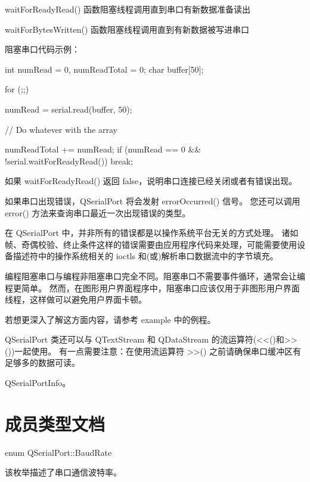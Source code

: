 \begin{compactitem}
\item waitForReadyRead() 函数阻塞线程调用直到串口有新数据准备读出
\item waitForBytesWritten() 函数阻塞线程调用直到有新数据被写进串口
\end{compactitem}

阻塞串口代码示例：

\begin{cppcode}
int numRead = 0, numReadTotal = 0;
char buffer[50];

for (;;) {
    numRead  = serial.read(buffer, 50);

    // Do whatever with the array

    numReadTotal += numRead;
    if (numRead == 0 && !serial.waitForReadyRead())
        break;
}
\end{cppcode}

如果 waitForReadyRead() 返回 false，说明串口连接已经关闭或者有错误出现。

如果串口出现错误，QSerialPort 将会发射 errorOccurred() 信号。
您还可以调用 error() 方法来查询串口最近一次出现错误的类型。

\begin{notice}
在 QSerialPort 中，并非所有的错误都是以操作系统平台无关的方式处理。
诸如帧、奇偶校验、终止条件这样的错误需要由应用程序代码来处理，可能需要使用设备描述符中的操作系统相关的 ioctls 和(或)解析串口数据流中的字节填充。
\end{notice}

编程阻塞串口与编程非阻塞串口完全不同。阻塞串口不需要事件循环，通常会让编程更简单。
然而，在图形用户界面程序中，阻塞串口应该仅用于非图形用户界面线程，这样做可以避免用户界面卡顿。

若想更深入了解这方面内容，请参考 example 中的例程。

QSerialPort 类还可以与 QTextStream 和 QDataStream 的流运算符(<<()和>>())一起使用。
有一点需要注意：在使用流运算符 >>() 之前请确保串口缓冲区有足够多的数据可读。

\begin{seeAlso}
QSerialPortInfo。
\end{seeAlso}

\section{成员类型文档}

enum QSerialPort::BaudRate

该枚举描述了串口通信波特率。

